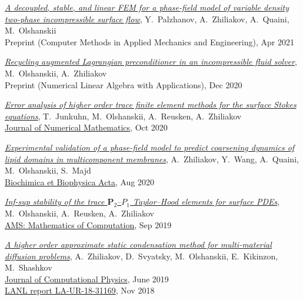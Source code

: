 \documentclass[a4paper,12pt]{article}
\begin{document}
	\begin{etaremune}[topsep=0pt]
		\item \textit{\href{https://arxiv.org/abs/2104.08996}{A decoupled, stable, and linear FEM for a phase-field model of variable density two-phase incompressible surface flow}}, Y.~Palzhanov, A.~Zhiliakov, A.~Quaini, M.~Olshanskii\\
		Preprint (Computer Methods in Applied Mechanics and Engineering), Apr 2021
		\item \textit{\href{https://arxiv.org/abs/2012.10073}{Recycling augmented Lagrangian preconditioner in an incompressible fluid solver}}, M.~Olshanskii, A.~Zhiliakov\\
		Preprint (Numerical Linear Algebra with Applications), Dec 2020
		\item \textit{\href{https://arxiv.org/abs/2003.06972}{Error analysis of higher order trace finite element methods for the surface Stokes equations}}, T.~Junkuhn, M.~Olshanskii, A.~Reusken, A.~Zhiliakov\\
		\href{https://doi.org/10.1515/jnma-2020-0017}{Journal of Numerical Mathematics}, Oct 2020		
		\item \textit{\href{https://arxiv.org/abs/2006.14125}{Experimental validation of a phase-field model to predict coarsening dynamics of lipid domains in multicomponent membranes}}, A.~Zhiliakov, Y.~Wang, A.~Quaini, M.~Olshanskii, S.~Majd\\
		\href{https://doi.org/10.1016/j.bbamem.2020.183446}{Biochimica et Biophysica Acta}, Aug 2020
		\item \textit{\href{https://arxiv.org/abs/1909.02990}{Inf-sup stability of the trace $\mathbf P_2$--$P_1$ Taylor--Hood elements for surface PDEs}}, M.~Olshanskii, A.~Reusken, A.~Zhiliakov\\ \href{https://doi.org/10.1090/mcom/3551}{AMS: Mathematics of Computation}, Sep 2019 
		\item \textit{\href{https://www.researchgate.net/publication/333900759_A_higher_order_approximate_static_condensation_method_for_multi-material_diffusion_problems}{A higher order approximate static condensation method for multi-material diffusion problems}}, A.~Zhiliakov, D.~Svyatsky, M.~Olshanskii, E.~Kikinzon, M.~Shashkov\\ \href{https://doi.org/10.1016/j.jcp.2019.06.044}{Journal of Computational Physics}, June 2019\\
		\href{https://permalink.lanl.gov/object/tr?what=info:lanl-repo/lareport/LA-UR-18-31169}{LANL report LA-UR-18-31169}, Nov 2018 

\end{etaremune}
\end{document}
